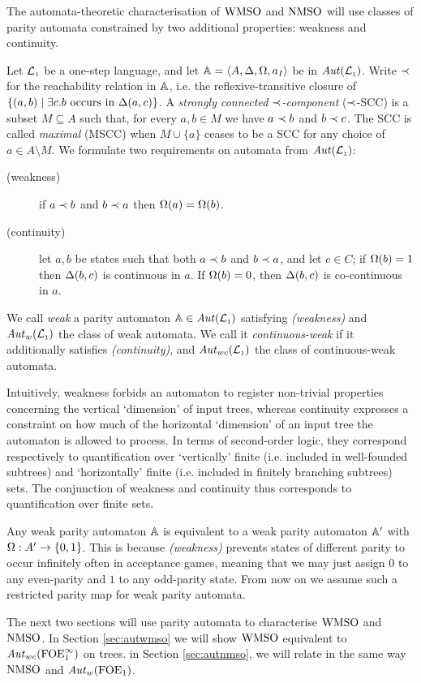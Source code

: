 The automata-theoretic characterisation of $\mathrm{WMSO}$ and $\mathrm{NMSO}$ will use classes of parity automata constrained by two additional properties: weakness
and continuity. 

\begin{definition}
\label{def:weak}
Let $\mathcal{L}_{\scriptscriptstyle 1}$ be a one-step language, and let $\mathbb{A} = \langle{A,\Delta,\Omega,a_I}\rangle$
be in $\mathit{Aut}(\mathcal{L}_{\scriptscriptstyle 1})$. Write $\prec$ for the reachability relation in $\mathbb{A}$, i.e. the reflexive-transitive closure of $\{ (a,b) \mid \exists c. b \text{ occurs in }\tmap(a,c)\}$. A \emph{strongly connected $\prec$-component} ($\prec$-SCC) is a subset $M\subseteq A$ such that, for every $a,b \in M$ we have $a \prec b$ and $b \prec c$. The SCC is called \emph{maximal} (MSCC) when $M\cup\{a\}$ ceases to be a SCC for any choice of $a \in A\setminus M$.
We formulate two requirements on automata from $\mathit{Aut}(\mathcal{L}_{\scriptscriptstyle 1})$:
\begin{description}
\item[(weakness)] if $a \prec b$ and $b \prec a$ then $\Omega(a) = \Omega(b)$.
\item[(continuity)] let $a,b$ be states such that both $a\prec b$ and
$b \prec a$, and let $c\in C$;
    if ${\Omega(b)}=1$ then $\Delta(b,c)$ is continuous in $a$.
    If $\Omega(b)=0$, then $\Delta(b,c)$ is co-continuous in $a$.
\end{description}
We call \emph{weak} a parity automaton $\mathbb{A} \in \mathit{Aut}(\mathcal{L}_{\scriptscriptstyle 1})$ satisfying \emph{(weakness)} and $\mathit{Aut}_{w}(\mathcal{L}_{\scriptscriptstyle 1})$ the class of weak automata. We call it \emph{continuous-weak} if it additionally satisfies \emph{(continuity)}, and $\mathit{Aut}_{wc}(\mathcal{L}_{\scriptscriptstyle 1})$ the class of continuous-weak automata.
\end{definition}


Intuitively, weakness forbids an automaton to register non-trivial properties concerning the vertical `dimension' of input trees, whereas continuity expresses a constraint on how much of the horizontal `dimension' of an input tree the automaton is allowed to process. In terms of second-order logic, they correspond respectively to quantification over `vertically' finite (i.e. included in well-founded subtrees) and `horizontally' finite (i.e. included in finitely branching subtrees) sets. The conjunction of weakness and continuity thus corresponds to quantification over finite sets. 


\begin{remark}
Any weak parity automaton $\mathbb{A}$ is equivalent to a weak parity automaton
$\mathbb{A}'$ with $\Omega: A' \to \{0,1\}$. This is because \emph{(weakness)} prevents states of different parity to occur infinitely often in acceptance games, meaning that we may just assign $0$ to any even-parity and $1$ to any odd-parity state. From now on we assume such a restricted parity map for weak parity automata.
\end{remark}

The next two sections will use parity automata to characterise $\mathrm{WMSO}$ and $\mathrm{NMSO}$. In Section \ref{sec:autwmso} we will show $\mathrm{WMSO}$ equivalent to $\mathit{Aut}_{wc}(\mathrm{FOE}^{\infty}_1)$ on trees. in Section \ref{sec:autnmso}, we will relate in the same way $\mathrm{NMSO}$ and $\mathit{Aut}_{w}(\mathrm{FOE}_1)$.

